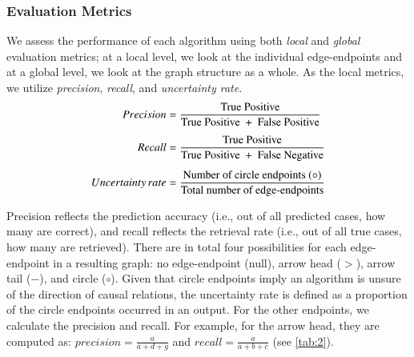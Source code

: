 \documentclass[11pt]{article}
\begin{document}
\subsubsection{Evaluation Metrics}
We assess the performance of each algorithm using both \textit{local} and \textit{global} evaluation metrics; at a local level, we look at the individual edge-endpoints and at a global level, we look at the graph structure as a whole. As the local metrics, we utilize \textit{precision}, \textit{recall}, and \textit{uncertainty rate}. 
\begin{align*}
Precision &= \frac{\text{True Positive}}{\text{True Positive } + \text{ False Positive}} \vspace{1mm} \\[1.1ex]
Recall &= \frac{\text{True Positive}}{\text{True Positive } + \text{ False Negative}} \\[1.1ex]
Uncertainty\, rate &= \frac{\text{Number of circle endpoints } (\circ)}{\text{Total number of edge-endpoints}}
\end{align*}

\noindent Precision reflects the prediction accuracy (i.e., out of all predicted cases, how many are correct), and recall reflects the retrieval rate (i.e., out of all true cases, how many are retrieved). There are in total four possibilities for each edge-endpoint in a resulting graph: no edge-endpoint (null), arrow head ($>$), arrow tail ($-$), and circle ($\circ$). Given that circle endpoints imply an algorithm is unsure of the direction of causal relations, the uncertainty rate is defined as a proportion of the circle endpoints occurred in an output.
For the other endpoints, we calculate the precision and recall. For example, for the arrow head, they are computed as: $precision =  \frac{a}{a + d + g}$ and $recall = \frac{a}{a + b + c}$ (see \autoref{tab:2}).
\end{document}
